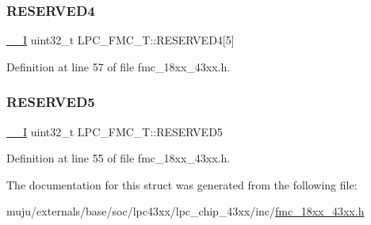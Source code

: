 \subsubsection{\texorpdfstring{R\+E\+S\+E\+R\+V\+E\+D4}{RESERVED4}}
{\footnotesize\ttfamily \hyperlink{core__sc300_8h_af63697ed9952cc71e1225efe205f6cd3}{\+\_\+\+\_\+I} uint32\+\_\+t L\+P\+C\+\_\+\+F\+M\+C\+\_\+\+T\+::\+R\+E\+S\+E\+R\+V\+E\+D4\mbox{[}5\mbox{]}}



Definition at line 57 of file fmc\+\_\+18xx\+\_\+43xx.\+h.

\mbox{\label{struct_l_p_c___f_m_c___t_a374b0f7e9083f242ad88ed5e83202636}} 
\subsubsection{\texorpdfstring{R\+E\+S\+E\+R\+V\+E\+D5}{RESERVED5}}
{\footnotesize\ttfamily \hyperlink{core__sc300_8h_af63697ed9952cc71e1225efe205f6cd3}{\+\_\+\+\_\+I} uint32\+\_\+t L\+P\+C\+\_\+\+F\+M\+C\+\_\+\+T\+::\+R\+E\+S\+E\+R\+V\+E\+D5}



Definition at line 55 of file fmc\+\_\+18xx\+\_\+43xx.\+h.



The documentation for this struct was generated from the following file\+:\begin{DoxyCompactItemize}
\item 
muju/externals/base/soc/lpc43xx/lpc\+\_\+chip\+\_\+43xx/inc/\hyperlink{fmc__18xx__43xx_8h}{fmc\+\_\+18xx\+\_\+43xx.\+h}\end{DoxyCompactItemize}
